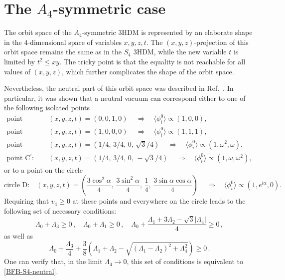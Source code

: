 \documentclass[11pt]{article}
\newcommand{\lr}[1]{ \langle #1 \rangle}
\begin{document}
\section{The $A_4$-symmetric case} \label{section-A4}

The orbit space of the $A_4$-symmetric 3HDM is represented by an elaborate shape
in the 4-dimensional space of variables $x,y,z,t$. 
The $(x,y,z)$-projection of this orbit space remains the same as in the $S_4$ 3HDM,
while the new variable $t$ is limited by $t^2 \le xy$.
The tricky point is that the equality is not reachable for all values of $(x,y,z)$,
which further complicates the shape of the orbit space.

Nevertheless, the neutral part of this orbit space was described in Ref.~\cite{Degee:2012sk}.
In particular, it was shown that a neutral vacuum can correspond either to one of the following isolated points
\begin{eqnarray}
\mbox{point A:} &\quad& (x,y,z,t) = (0,0,1,0)\, \quad \Rightarrow \quad \lr{\phi_i^0} \propto (1, 0, 0),\nonumber\\
\mbox{point B:} &\quad& (x,y,z,t) = (1,0,0,0)\, \quad \Rightarrow \quad \lr{\phi_i^0} \propto (1, 1, 1),\nonumber\\
\mbox{point C:} &\quad& (x,y,z,t) = (1/4,\, 3/4,\, 0,\, \sqrt{3}/4)\, \quad \Rightarrow \quad \lr{\phi_i^0} \propto (1,\omega^2,\omega),\nonumber\\
\mbox{point C${}^\prime$:} &\quad& (x,y,z,t) = (1/4,\, 3/4,\, 0,\, -\sqrt{3}/4)\, \quad \Rightarrow \quad \lr{\phi_i^0} \propto (1,\omega,\omega^2),
\label{points-A4-neutral-points}
\end{eqnarray}
or to a point on the circle 
\begin{equation}
\mbox{circle D:} \quad (x,y,z,t) = \left(\frac{3\cos^2\alpha}{4},\, \frac{3\sin^2\alpha}{4},\, \frac{1}{4},\,
\frac{3\sin\alpha\cos\alpha}{4}\right)\, \quad \Rightarrow \quad \lr{\phi_i^0} \propto (1, e^{i\alpha}, 0).
\end{equation}
Requiring that $v_4\ge 0$ at these points and everywhere on the circle leads to the following set of necessary conditions:
\begin{equation}
\Lambda_0 + \Lambda_3 \ge 0\,, \quad \Lambda_0 + \Lambda_1 \ge 0\,, \quad 
\Lambda_0 + \frac{\Lambda_1 + 3\Lambda_2 - \sqrt{3}|\Lambda_4|}{4} \ge 0\,,  
\label{BFB-A4-neutral-points}
\end{equation}
as well as
\begin{equation}
\Lambda_0 + \frac{\Lambda_3}{4} + \frac{3}{8}\left(\Lambda_1 + \Lambda_2 - \sqrt{(\Lambda_1-\Lambda_2)^2 + \Lambda_4^2}\right) \ge 0\,. 
\label{BFB-A4-neutral-circle}
\end{equation}
One can verify that, in the limit $\Lambda_4 \to 0$, this set of conditions is equivalent to \eqref{BFB-S4-neutral}.
\end{document}
